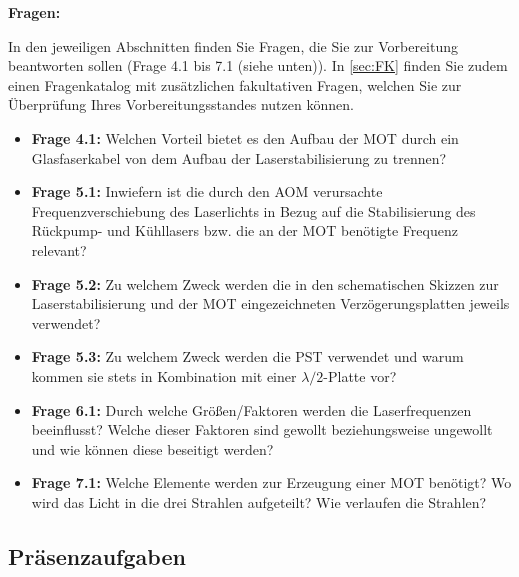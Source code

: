 \documentclass[
class=book,
accentcolor=1b,
custommargins=geometry,
fontsize=11pt,
thesis={type=Versuchsanleitung},
ruledheaders=all,
headline=false,
instbox=false,
marginpar=false,
title=small,
ignore-missing-data=true,
twoside=false,
pdfa=false %
]{apqpub}
\begin{document}
\textbf{Fragen:}  

In den jeweiligen Abschnitten finden Sie Fragen, die Sie zur Vorbereitung beantworten sollen (Frage 4.1 bis 7.1 (siehe unten)). In \autoref{sec:FK} finden Sie zudem einen Fragenkatalog mit zusätzlichen fakultativen Fragen, welchen Sie zur Überprüfung Ihres Vorbereitungsstandes nutzen können.

\begin{itemize}
	\item \textbf{Frage 4.1:} Welchen Vorteil bietet es den Aufbau der MOT durch ein Glasfaserkabel von dem Aufbau der Laserstabilisierung zu trennen?
	
	\item \textbf{Frage 5.1:} Inwiefern ist die durch den AOM verursachte Frequenzverschiebung des Laserlichts in Bezug auf die Stabilisierung des Rückpump- und Kühllasers bzw. die an der MOT benötigte Frequenz relevant?
	
	\item \textbf{Frage 5.2:} Zu welchem Zweck werden die in den schematischen Skizzen zur Laserstabilisierung und der MOT eingezeichneten Verzögerungsplatten jeweils verwendet?
	
	\item \textbf{Frage 5.3:} Zu welchem Zweck werden die PST verwendet und warum kommen sie stets in Kombination mit einer $\lambda/2$-Platte vor?  
	
	\item \textbf{Frage 6.1:} Durch welche Größen/Faktoren werden die Laserfrequenzen beeinflusst? Welche dieser Faktoren sind gewollt beziehungsweise ungewollt und wie können diese beseitigt werden?
	
	\item \textbf{Frage 7.1:} Welche Elemente werden zur Erzeugung einer MOT benötigt? Wo wird das Licht in die drei Strahlen aufgeteilt? Wie verlaufen die Strahlen?
\end{itemize}

\newpage

\subsection{Präsenzaufgaben}
\end{document}

